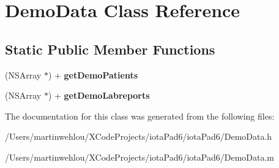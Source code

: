 \hypertarget{interface_demo_data}{
\section{DemoData Class Reference}
\label{interface_demo_data}
}
\subsection*{Static Public Member Functions}
\begin{DoxyCompactItemize}
\item 
\hypertarget{interface_demo_data_a2593be9357a957be868f558df4c85aa5}{
(NSArray $\ast$) + {\bfseries getDemoPatients}}
\label{interface_demo_data_a2593be9357a957be868f558df4c85aa5}

\item 
\hypertarget{interface_demo_data_a7d9c70f9935756e5cbe740bd0933e633}{
(NSArray $\ast$) + {\bfseries getDemoLabreports}}
\label{interface_demo_data_a7d9c70f9935756e5cbe740bd0933e633}

\end{DoxyCompactItemize}


The documentation for this class was generated from the following files:\begin{DoxyCompactItemize}
\item 
/Users/martinwehlou/XCodeProjects/iotaPad6/iotaPad6/DemoData.h\item 
/Users/martinwehlou/XCodeProjects/iotaPad6/iotaPad6/DemoData.m\end{DoxyCompactItemize}
